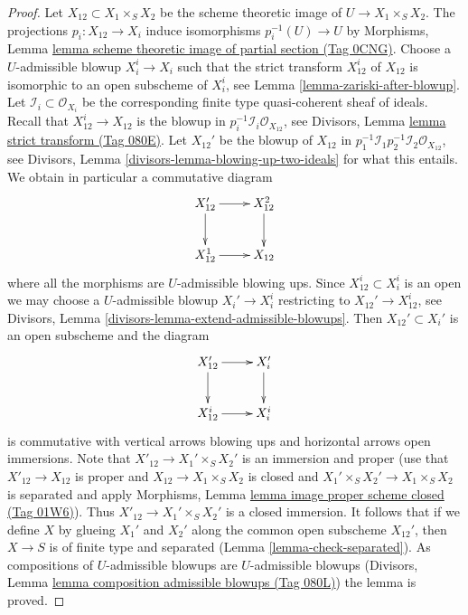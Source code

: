 \documentclass{amsart}
\theoremstyle{plain}
\theoremstyle{definition}
\theoremstyle{remark}
\numberwithin{equation}{subsection}
\begin{document}
\begin{proof}
\medskip\noindent
Let $X_{12} \subset X_1 \times_S X_2$ be the scheme theoretic image
of $U \to X_1 \times_S X_2$. The projections $p_i : X_{12} \to X_i$
induce isomorphisms $p_i^{-1}(U) \to U$ by
Morphisms, Lemma
\href{https://stacks.math.columbia.edu/tag/0CNG}{lemma scheme theoretic image of partial section (Tag 0CNG)}.
Choose a $U$-admissible blowup $X_i^i \to X_i$ such that
the strict transform $X_{12}^i$ of $X_{12}$ is isomorphic to an
open subscheme of $X_i^i$, see
Lemma \ref{lemma-zariski-after-blowup}.
Let $\mathcal{I}_i \subset \mathcal{O}_{X_i}$ be the corresponding
finite type quasi-coherent sheaf of ideals.
Recall that $X_{12}^i \to X_{12}$ is the blowup in
$p_i^{-1}\mathcal{I}_i \mathcal{O}_{X_{12}}$, see
Divisors, Lemma \href{https://stacks.math.columbia.edu/tag/080E}{lemma strict transform (Tag 080E)}.
Let $X_{12}'$ be the blowup of $X_{12}$ in
$p_1^{-1}\mathcal{I}_1 p_2^{-1}\mathcal{I}_2 \mathcal{O}_{X_{12}}$, see
Divisors, Lemma \ref{divisors-lemma-blowing-up-two-ideals}
for what this entails. We obtain in particular a commutative diagram
$$
\xymatrix{
X_{12}' \ar[d] \ar[r] & X_{12}^2 \ar[d] \\
X_{12}^1 \ar[r] & X_{12}
}
$$
where all the morphisms are $U$-admissible blowing ups.
Since $X_{12}^i \subset X_i^i$ is an open we may choose a $U$-admissible blowup
$X_i' \to X_i^i$ restricting to $X_{12}' \to X_{12}^i$, see
Divisors, Lemma \ref{divisors-lemma-extend-admissible-blowups}.
Then $X_{12}' \subset X_i'$ is an open subscheme and the diagram
$$
\xymatrix{
X_{12}' \ar[d] \ar[r] & X_i' \ar[d] \\
X_{12}^i \ar[r] & X_i^i
}
$$
is commutative with vertical arrows blowing ups and horizontal arrows
open immersions. Note that $X'_{12} \to X_1' \times_S X_2'$ is
an immersion and proper (use that $X'_{12} \to X_{12}$ is proper
and $X_{12} \to X_1 \times_S X_2$ is closed and $X_1' \times_S X_2' \to
X_1 \times_S X_2$ is separated and apply Morphisms, Lemma
\href{https://stacks.math.columbia.edu/tag/01W6}{lemma image proper scheme closed (Tag 01W6)}).
Thus $X'_{12} \to  X_1' \times_S X_2'$ is a closed immersion.
It follows that if we define $X$ by glueing $X_1'$ and $X_2'$
along the common open subscheme $X_{12}'$, then $X \to S$ is of finite type
and separated (Lemma \ref{lemma-check-separated}).
As compositions of $U$-admissible blowups are $U$-admissible blowups
(Divisors, Lemma \href{https://stacks.math.columbia.edu/tag/080L}{lemma composition admissible blowups (Tag 080L)})
the lemma is proved.
\end{proof}
\end{document}
